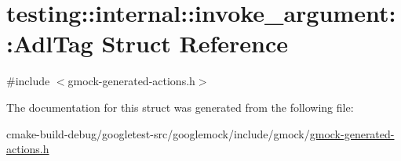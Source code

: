 \hypertarget{structtesting_1_1internal_1_1invoke__argument_1_1AdlTag}{}\section{testing\+::internal\+::invoke\+\_\+argument\+::Adl\+Tag Struct Reference}
\label{structtesting_1_1internal_1_1invoke__argument_1_1AdlTag}


{\ttfamily \#include $<$gmock-\/generated-\/actions.\+h$>$}



The documentation for this struct was generated from the following file\+:\begin{DoxyCompactItemize}
\item 
cmake-\/build-\/debug/googletest-\/src/googlemock/include/gmock/\mbox{\hyperlink{gmock-generated-actions_8h}{gmock-\/generated-\/actions.\+h}}\end{DoxyCompactItemize}
